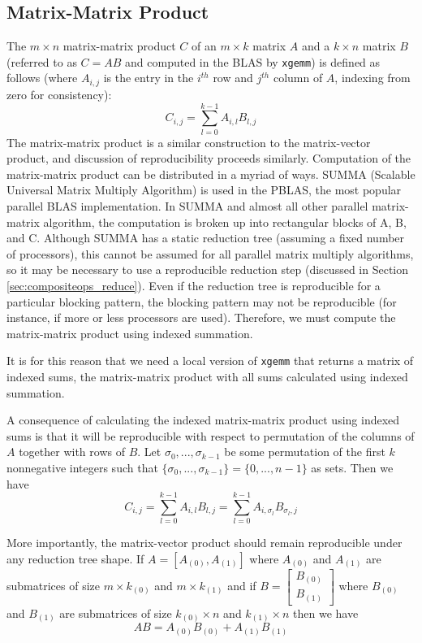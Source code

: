 \subsection{Matrix-Matrix Product}
  \label{sec:compositeops_gemm}
  The $m \times n$ matrix-matrix product $C$ of an $m \times k$ matrix $A$ and a $k \times n$ matrix $B$(referred to as $C = AB$ and computed in the BLAS by \texttt{xgemm}) is defined as follows (where $A_{i, j}$ is the entry in the $i^{th}$ row and $j^{th}$ column of $A$, indexing from zero for consistency):
  \[
    C_{i, j} = \sum\limits_{l = 0}^{k - 1} A_{i, l}B_{l, j}
  \]
  The matrix-matrix product is a similar construction to the matrix-vector product, and discussion of reproducibility proceeds similarly.
  Computation of the matrix-matrix product can be distributed in a myriad of ways. SUMMA (Scalable Universal Matrix Multiply Algorithm) \cite{SUMMA} is used in the PBLAS, the most popular parallel BLAS implementation. In SUMMA and almost all other parallel matrix-matrix algorithm, the computation is broken up into rectangular blocks of A, B, and C. Although SUMMA has a static reduction tree (assuming a fixed number of processors), this cannot be assumed for all parallel matrix multiply algorithms, so it may be necessary to use a reproducible reduction step (discussed in Section \ref{sec:compositeops_reduce}).
  Even if the reduction tree is reproducible for a particular blocking pattern, the blocking pattern may not be reproducible (for instance, if more or less processors are used). Therefore, we must compute the matrix-matrix product using indexed summation.

  It is for this reason that we need a local version of \texttt{xgemm} that returns a matrix of indexed sums, the matrix-matrix product with all sums calculated using indexed summation.

  A consequence of calculating the indexed matrix-matrix product using indexed sums is that it will be reproducible with respect to permutation of the columns of $A$ together with rows of $B$.
  Let $\sigma_0, ..., \sigma_{k - 1}$ be some permutation of the first $k$ nonnegative integers such that $\{\sigma_0, ..., \sigma_{k - 1}\} = \{0, ..., n - 1\}$ as sets. Then we have
  \[
    C_{i, j} = \sum\limits_{l = 0}^{k - 1} A_{i, l}B_{l, j} = \sum\limits_{l = 0}^{k - 1} A_{i, \sigma_l}B_{\sigma_l, j}
  \]

  More importantly, the matrix-vector product should remain reproducible under any reduction tree shape.
  If $A = [A_{(0)}, A_{(1)}]$ where $A_{(0)}$ and $A_{(1)}$ are submatrices of size $m \times k_{(0)}$ and $m \times k_{(1)}$ and if $B = \left[\begin{array}{c}B_{(0)}\\ B_{(1)}\end{array}\right]$ where $B_{(0)}$ and $B_{(1)}$ are submatrices of size $k_{(0)} \times n$ and $k_{(1)} \times n$ then we have 
  \[
    AB = A_{(0)}B_{(0)} + A_{(1)}B_{(1)}
  \]

